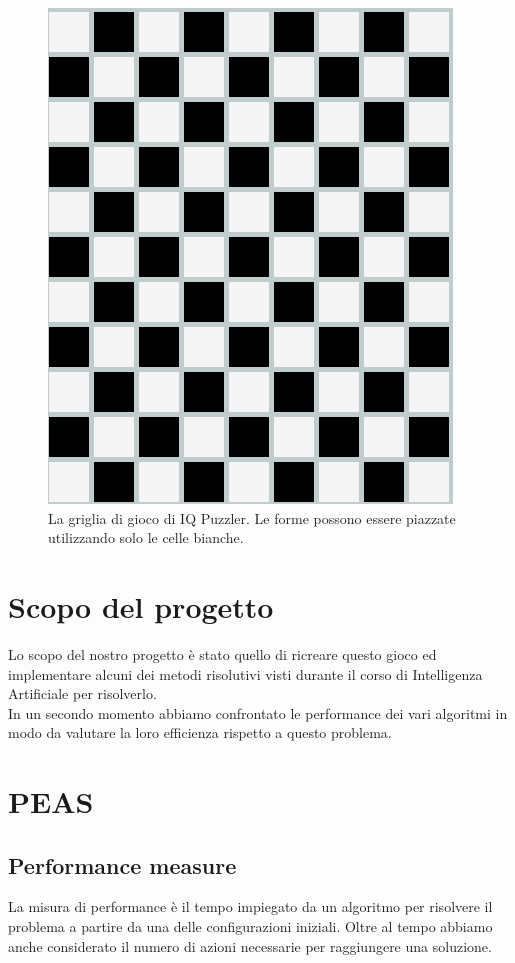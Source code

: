 \begin{figure}[h]
	\centering
	\includegraphics[scale=0.3]{immagini/griglia}
	\caption{La griglia di gioco di IQ Puzzler. Le forme possono essere piazzate utilizzando solo le celle bianche.}
	\label{fig:griglia}
\end{figure}


\newpage
\section{Scopo del progetto}
Lo scopo del nostro progetto è stato quello di ricreare questo gioco ed implementare alcuni dei metodi risolutivi visti durante il corso di Intelligenza Artificiale per risolverlo. \\
In un secondo momento abbiamo confrontato le performance dei vari algoritmi in modo da valutare la loro efficienza rispetto a questo problema.

\section{PEAS}

\subsection{Performance measure}
La misura di performance è il tempo impiegato da un algoritmo per risolvere il problema a partire da una delle configurazioni iniziali. Oltre al tempo abbiamo anche considerato il numero di azioni necessarie per raggiungere una soluzione.

